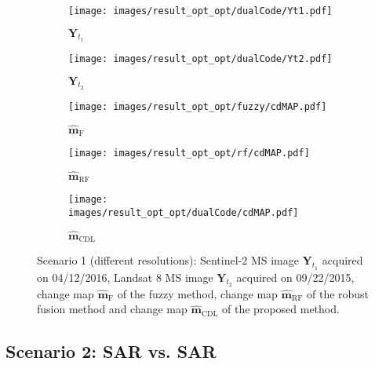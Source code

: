 \documentclass[review]{elsarticle}
\begin{document}
\begin{figure}[h!]
\centering
			\begin{subfigure}{\subfwidth}
					\centering
					\texttt{[image: images/result\_opt\_opt/dualCode/Yt1.pdf]}
					\caption{$\mathbf{Y}_{t_1}$}
					\label{fig:s2s2Yt1_1}
			\end{subfigure}
			\begin{subfigure}{\subfwidth}
					\centering
					\texttt{[image: images/result\_opt\_opt/dualCode/Yt2.pdf]}
					\caption{$\mathbf{Y}_{t_2}$}
					\label{fig:s2s2Yt2_1}
			\end{subfigure}
            \begin{subfigure}{\subfwidth}
					\centering
					\texttt{[image: images/result\_opt\_opt/fuzzy/cdMAP.pdf]}
					\caption{$\hat{\mathbf{m}}_{\mathrm{F}}$}
					\label{fig:s2s2FMAP_1}
			\end{subfigure}
            \begin{subfigure}{\subfwidth}
					\centering
					\texttt{[image: images/result\_opt\_opt/rf/cdMAP.pdf]}
					\caption{$\hat{\mathbf{m}}_{\mathrm{RF}}$}
					\label{fig:s2s2RFMAP_1}
			\end{subfigure}
			\begin{subfigure}{\subfwidth}
					\centering
					\texttt{[image: images/result\_opt\_opt/dualCode/cdMAP.pdf]}
					\caption{$\hat{\mathbf{m}}_{\mathrm{CDL}}$}
					\label{fig:s2s2DCMAP_1}
			\end{subfigure}
\caption{Scenario 1 (different resolutions): \protect{}  Sentinel-2 MS image $\mathbf{Y}_{t_1}$ acquired on 04/12/2016, \protect{}  Landsat 8 MS image $\mathbf{Y}_{t_2}$ acquired on 09/22/2015, \protect{} change map $\hat{\mathbf{m}}_{\mathrm{F}}$ of the fuzzy method, \protect{} change map $\hat{\mathbf{m}}_{\mathrm{RF}}$ of the robust fusion method
	 and \protect{} change map $\hat{\mathbf{m}}_{\mathrm{CDL}}$ of the proposed method.}%
	\label{fig:realS2S2_1}%
\end{figure}


\subsection{Scenario 2: SAR vs. SAR}
\end{document}
